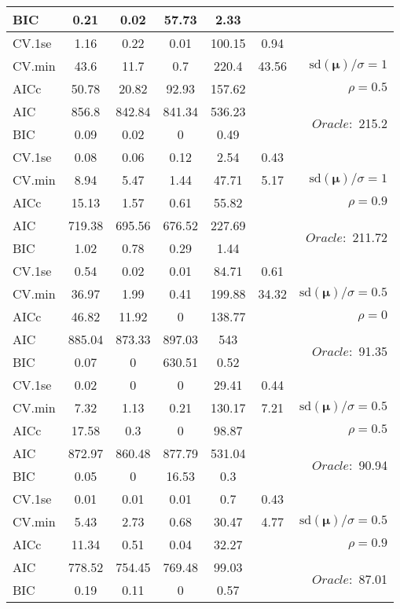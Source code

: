 \begin{table}
\begin{center}
\begin{tabular}{l*{5}{c}|r}
BIC & 0.21 & 0.02 & 57.73 & 2.33 & &  \\
 \hline 
CV.1se & 1.16 & 0.22 & 0.01 & 100.15 & 0.94 & \\
CV.min & 43.6 & 11.7 & 0.7 & 220.4 & 43.56 &  $\mathrm{sd}(\mathbf{\mu})/\sigma=1$ \\
AICc & 50.78 & 20.82 & 92.93 & 157.62 & & $\rho=0.5$ \\
AIC & 856.8 & 842.84 & 841.34 & 536.23 & &  \multirow{2}{*}{$Oracle: $ 215.2} \\
BIC & 0.09 & 0.02 & 0 & 0.49 & &  \\
 \hline 
CV.1se & 0.08 & 0.06 & 0.12 & 2.54 & 0.43 & \\
CV.min & 8.94 & 5.47 & 1.44 & 47.71 & 5.17 &  $\mathrm{sd}(\mathbf{\mu})/\sigma=1$ \\
AICc & 15.13 & 1.57 & 0.61 & 55.82 & & $\rho=0.9$ \\
AIC & 719.38 & 695.56 & 676.52 & 227.69 & &  \multirow{2}{*}{$Oracle: $ 211.72} \\
BIC & 1.02 & 0.78 & 0.29 & 1.44 & &  \\
 \hline 
CV.1se & 0.54 & 0.02 & 0.01 & 84.71 & 0.61 & \\
CV.min & 36.97 & 1.99 & 0.41 & 199.88 & 34.32 &  $\mathrm{sd}(\mathbf{\mu})/\sigma=0.5$ \\
AICc & 46.82 & 11.92 & 0 & 138.77 & & $\rho=0$ \\
AIC & 885.04 & 873.33 & 897.03 & 543 & &  \multirow{2}{*}{$Oracle: $ 91.35} \\
BIC & 0.07 & 0 & 630.51 & 0.52 & &  \\
 \hline 
CV.1se & 0.02 & 0 & 0 & 29.41 & 0.44 & \\
CV.min & 7.32 & 1.13 & 0.21 & 130.17 & 7.21 &  $\mathrm{sd}(\mathbf{\mu})/\sigma=0.5$ \\
AICc & 17.58 & 0.3 & 0 & 98.87 & & $\rho=0.5$ \\
AIC & 872.97 & 860.48 & 877.79 & 531.04 & &  \multirow{2}{*}{$Oracle: $ 90.94} \\
BIC & 0.05 & 0 & 16.53 & 0.3 & &  \\
 \hline 
CV.1se & 0.01 & 0.01 & 0.01 & 0.7 & 0.43 & \\
CV.min & 5.43 & 2.73 & 0.68 & 30.47 & 4.77 &  $\mathrm{sd}(\mathbf{\mu})/\sigma=0.5$ \\
AICc & 11.34 & 0.51 & 0.04 & 32.27 & & $\rho=0.9$ \\
AIC & 778.52 & 754.45 & 769.48 & 99.03 & &  \multirow{2}{*}{$Oracle: $ 87.01} \\
BIC & 0.19 & 0.11 & 0 & 0.57 & &  \\
 \hline 
\end{tabular}
\end{center}
\vspace{-1cm}
\end{table}




